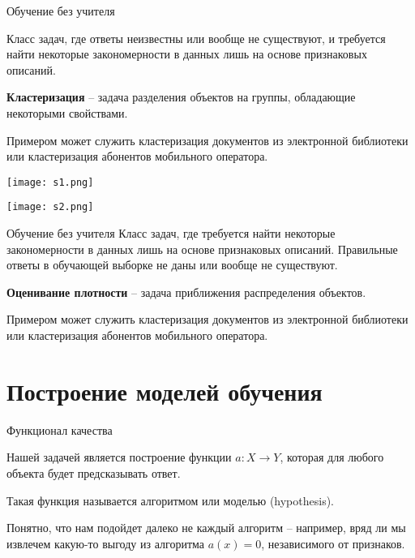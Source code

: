\documentclass[pdf, intlimits, 9pt, unicode]{beamer}
\begin{document}
\begin{frame}{Обучение без учителя}

Класс задач, где ответы неизвестны или вообще не существуют, и требуется найти некоторые закономерности в данных лишь на основе признаковых описаний.\pause

\textbf{Кластеризация} -- задача разделения объектов на группы, обладающие некоторыми свойствами.\pause
\bigskip

Примером может служить кластеризация документов из электронной библиотеки или кластеризация абонентов мобильного оператора.
\end{frame}




\begin{frame}
\begin{center}\texttt{[image: s1.png]}\end{center}
\end{frame}




\begin{frame}
\begin{center}\texttt{[image: s2.png]}\end{center}
\end{frame}





\begin{frame}{Обучение без учителя}
Класс задач, где требуется найти некоторые закономерности в данных лишь на основе признаковых описаний. Правильные ответы в обучающей выборке не даны или вообще не существуют.\pause

\textbf{Оценивание плотности} -- задача приближения распределения объектов.\pause
\bigskip

Примером может служить кластеризация документов из
электронной библиотеки или кластеризация абонентов мобильного оператора.
\end{frame}





\section{Построение моделей обучения}





\begin{frame}{Функционал качества}

Нашей задачей является построение функции $a : X \rightarrow Y$, которая для любого объекта будет предсказывать ответ.\pause

Такая функция называется алгоритмом или моделью (hypothesis).\pause

Понятно, что нам подойдет далеко не каждый алгоритм -- например, вряд ли мы извлечем какую-то выгоду из алгоритма $a(x) = 0$, независимого от признаков.
\end{frame}
\end{document}
